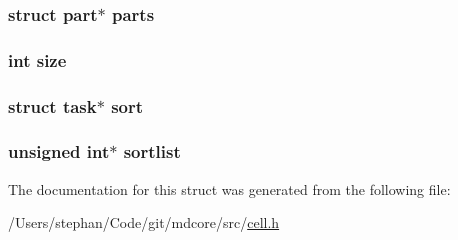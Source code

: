 \hypertarget{structcell_a9de7180e861590a7c5ff24ae3eab56ed}{
\subsubsection[{parts}]{\setlength{\rightskip}{0pt plus 5cm}struct {\bf part}$\ast$ parts}}\label{structcell_a9de7180e861590a7c5ff24ae3eab56ed}
\hypertarget{structcell_a439227feff9d7f55384e8780cfc2eb82}{
\subsubsection[{size}]{\setlength{\rightskip}{0pt plus 5cm}int size}}\label{structcell_a439227feff9d7f55384e8780cfc2eb82}
\hypertarget{structcell_aa5f1733249f610dbecb00b23369c2008}{
\subsubsection[{sort}]{\setlength{\rightskip}{0pt plus 5cm}struct {\bf task}$\ast$ sort}}\label{structcell_aa5f1733249f610dbecb00b23369c2008}
\hypertarget{structcell_a4151bd113572f23f471e24240cad4e65}{
\subsubsection[{sortlist}]{\setlength{\rightskip}{0pt plus 5cm}unsigned int$\ast$ sortlist}}\label{structcell_a4151bd113572f23f471e24240cad4e65}


The documentation for this struct was generated from the following file\-:\begin{DoxyCompactItemize}
\item 
/\-Users/stephan/\-Code/git/mdcore/src/\hyperlink{cell_8h}{cell.\-h}\end{DoxyCompactItemize}
